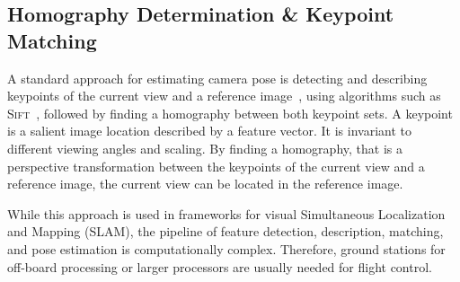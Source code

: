 \subsection{Homography Determination \& Keypoint Matching}
\label{sec:keypointmatching}

A standard approach for estimating camera pose is detecting and
describing keypoints of the current view and a reference image~\cite{se2002global}, using
algorithms such as \textsc{Sift}~\cite{lowe1999object}, followed by finding a homography between both keypoint sets. A
keypoint is a salient image location described by a feature vector. It is invariant to different
viewing angles and scaling. By finding a homography, that is a perspective transformation between the keypoints of the current view and a reference image, the current view can be located in the reference image.


While this approach is used in frameworks for visual Simultaneous Localization and Mapping (SLAM), the pipeline of feature detection, description, matching, and pose estimation is computationally complex. Therefore, ground stations for off-board processing or larger processors are usually needed for flight control.  

